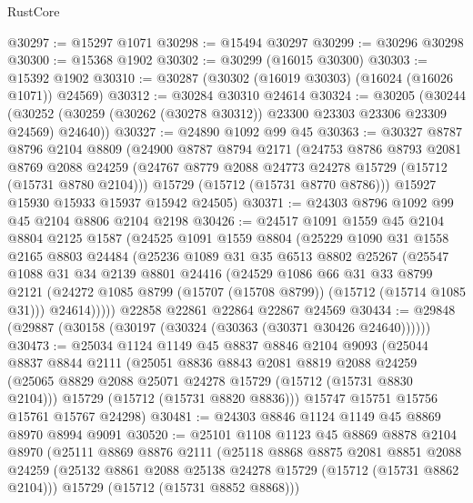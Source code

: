 \begin{lexlean}{RustCore}
\begin{coremodule}
@30297 := @15297 @1071
@30298 := @15494 @30297
@30299 := @30296 @30298
@30300 := @15368 @1902
@30302 := @30299 (@16015 @30300)
@30303 := @15392 @1902
@30310 := @30287 (@30302 (@16019 @30303) (@16024 (@16026 @1071)) @24569)
@30312 := @30284 @30310 @24614
@30324 := @30205
    (@30244 (@30252 (@30259 (@30262 (@30278 @30312)) @23300 @23303 @23306 @23309 @24569) @24640))
@30327 := @24890 @1092 @99 @45
@30363 := @30327
    @8787
    @8796
    @2104
    @8809
    (@24900
      @8787
      @8794
      @2171
      (@24753
        @8786
        @8793
        @2081
        @8769
        @2088
        @24259
        (@24767 @8779 @2088 @24773 @24278 @15729 (@15712 (@15731 @8780 @2104)))
        @15729
        (@15712 (@15731 @8770 @8786)))
      @15927
      @15930
      @15933
      @15937
      @15942
      @24505)
@30371 := @24303 @8796 @1092 @99 @45 @2104 @8806 @2104 @2198
@30426 := @24517
    @1091
    @1559
    @45
    @2104
    @8804
    @2125
    @1587
    (@24525
      @1091
      @1559
      @8804
      (@25229
        @1090
        @31
        @1558
        @2165
        @8803
        @24484
        (@25236
          @1089
          @31
          @35
          @6513
          @8802
          @25267
          (@25547
            @1088
            @31
            @34
            @2139
            @8801
            @24416
            (@24529
              @1086
              @66
              @31
              @33
              @8799
              @2121
              (@24272 @1085 @8799 (@15707 (@15708 @8799)) (@15712 (@15714 @1085 @31)))
              @24614)))))
    @22858
    @22861
    @22864
    @22867
    @24569
@30434 := @29848 (@29887 (@30158 (@30197 (@30324 (@30363 (@30371 @30426 @24640))))))
@30473 := @25034
    @1124
    @1149
    @45
    @8837
    @8846
    @2104
    @9093
    (@25044
      @8837
      @8844
      @2111
      (@25051
        @8836
        @8843
        @2081
        @8819
        @2088
        @24259
        (@25065 @8829 @2088 @25071 @24278 @15729 (@15712 (@15731 @8830 @2104)))
        @15729
        (@15712 (@15731 @8820 @8836)))
      @15747
      @15751
      @15756
      @15761
      @15767
      @24298)
@30481 := @24303 @8846 @1124 @1149 @45 @8869 @8970 @8994 @9091
@30520 := @25101
    @1108
    @1123
    @45
    @8869
    @8878
    @2104
    @8970
    (@25111
      @8869
      @8876
      @2111
      (@25118
        @8868
        @8875
        @2081
        @8851
        @2088
        @24259
        (@25132 @8861 @2088 @25138 @24278 @15729 (@15712 (@15731 @8862 @2104)))
        @15729
        (@15712 (@15731 @8852 @8868)))

\end{coremodule}
\end{lexlean}
